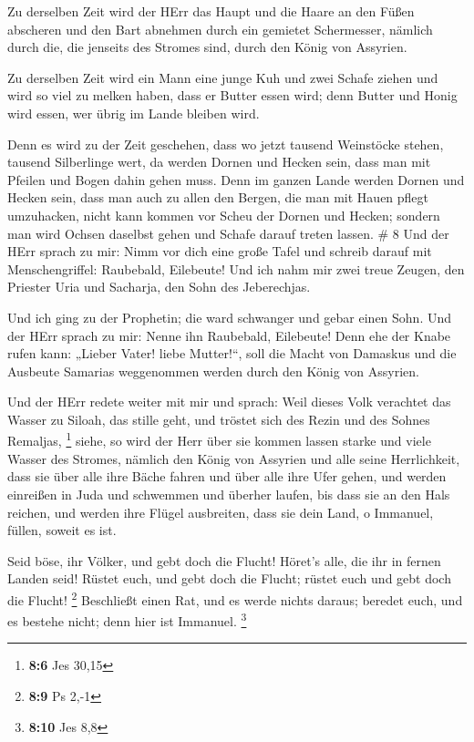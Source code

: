  Zu derselben Zeit wird der HErr das Haupt und die Haare an
den Füßen abscheren und den Bart abnehmen durch ein gemietet
Schermesser, nämlich durch die, die jenseits des Stromes sind, durch den
König von Assyrien.

 Zu derselben Zeit wird ein Mann eine junge Kuh und zwei
Schafe ziehen  und wird so viel zu melken haben, dass er
Butter essen wird; denn Butter und Honig wird essen, wer übrig im Lande
bleiben wird.

 Denn es wird zu der Zeit geschehen, dass wo jetzt tausend
Weinstöcke stehen, tausend Silberlinge wert, da werden Dornen und Hecken
sein,  dass man mit Pfeilen und Bogen dahin gehen muss.
Denn im ganzen Lande werden Dornen und Hecken sein,  dass
man auch zu allen den Bergen, die man mit Hauen pflegt umzuhacken, nicht
kann kommen vor Scheu der Dornen und Hecken; sondern man wird Ochsen
daselbst gehen und Schafe darauf treten lassen. \# 8  Und
der HErr sprach zu mir: Nimm vor dich eine große Tafel und schreib
darauf mit Menschengriffel: Raubebald, Eilebeute!  Und ich
nahm mir zwei treue Zeugen, den Priester Uria und Sacharja, den Sohn des
Jeberechjas.

 Und ich ging zu der Prophetin; die ward schwanger und gebar
einen Sohn. Und der HErr sprach zu mir: Nenne ihn Raubebald, Eilebeute!
 Denn ehe der Knabe rufen kann: „Lieber Vater! liebe
Mutter!{}``, soll die Macht von Damaskus und die Ausbeute Samarias
weggenommen werden durch den König von Assyrien.

 Und der HErr redete weiter mit mir und sprach: 
Weil dieses Volk verachtet das Wasser zu Siloah, das stille geht, und
tröstet sich des Rezin und des Sohnes Remaljas, \footnote{\textbf{8:6}
  Jes 30,15}  siehe, so wird der Herr über sie kommen lassen
starke und viele Wasser des Stromes, nämlich den König von Assyrien und
alle seine Herrlichkeit, dass sie über alle ihre Bäche fahren und über
alle ihre Ufer gehen,  und werden einreißen in Juda und
schwemmen und überher laufen, bis dass sie an den Hals reichen, und
werden ihre Flügel ausbreiten, dass sie dein Land, o Immanuel, füllen,
soweit es ist.

 Seid böse, ihr Völker, und gebt doch die Flucht! Höret's
alle, die ihr in fernen Landen seid! Rüstet euch, und gebt doch die
Flucht; rüstet euch und gebt doch die Flucht! \footnote{\textbf{8:9} Ps
  2,-1}  Beschließt einen Rat, und es werde nichts daraus;
beredet euch, und es bestehe nicht; denn hier ist Immanuel. \footnote{\textbf{8:10}
  Jes 8,8}

